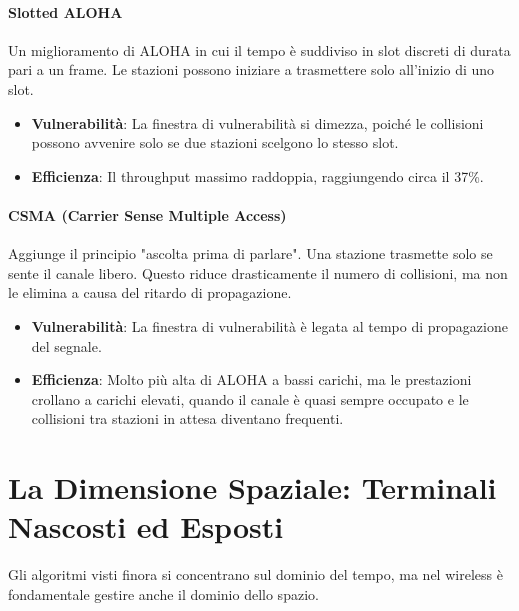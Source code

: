 \paragraph{Slotted ALOHA}
Un miglioramento di ALOHA in cui il tempo è suddiviso in slot discreti di durata pari a un frame. Le stazioni possono iniziare a trasmettere solo all'inizio di uno slot.
\begin{itemize}
    \item \textbf{Vulnerabilità}: La finestra di vulnerabilità si dimezza, poiché le collisioni possono avvenire solo se due stazioni scelgono lo stesso slot.
    \item \textbf{Efficienza}: Il throughput massimo raddoppia, raggiungendo circa il 37\%.
\end{itemize}

\paragraph{CSMA (Carrier Sense Multiple Access)}
Aggiunge il principio "ascolta prima di parlare". Una stazione trasmette solo se sente il canale libero. Questo riduce drasticamente il numero di collisioni, ma non le elimina a causa del ritardo di propagazione.
\begin{itemize}
    \item \textbf{Vulnerabilità}: La finestra di vulnerabilità è legata al tempo di propagazione del segnale.
    \item \textbf{Efficienza}: Molto più alta di ALOHA a bassi carichi, ma le prestazioni crollano a carichi elevati, quando il canale è quasi sempre occupato e le collisioni tra stazioni in attesa diventano frequenti.
\end{itemize}


\section{La Dimensione Spaziale: Terminali Nascosti ed Esposti}
Gli algoritmi visti finora si concentrano sul dominio del tempo, ma nel wireless è fondamentale gestire anche il dominio dello spazio.


